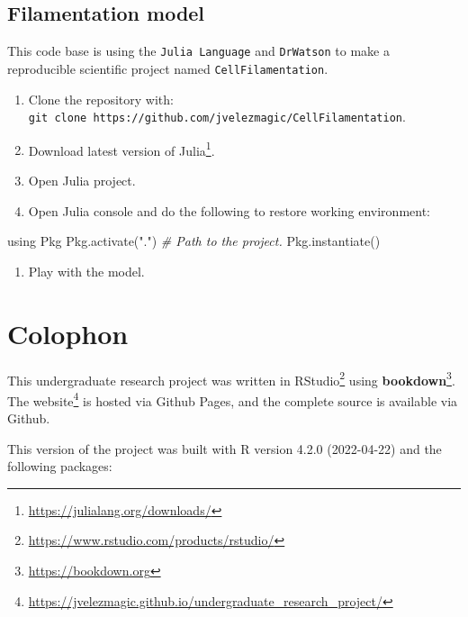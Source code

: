 \documentclass[
  12pt,
  a4paper,
  oneside]{krantz}
\newenvironment{Shaded}{\begin{snugshade}}{\end{snugshade}}
\newcommand{\CommentTok}[1]{\textcolor[rgb]{0.56,0.35,0.01}{\textit{#1}}}
\newcommand{\NormalTok}[1]{#1}
\newcommand{\StringTok}[1]{\textcolor[rgb]{0.31,0.60,0.02}{#1}}
\providecommand{\tightlist}{%
  \setlength{\itemsep}{0pt}\setlength{\parskip}{0pt}}
\renewcommand{\href}[2]{#2\footnote{\url{#1}}}
\begin{document}
\hypertarget{filamentation-model-1}{%
\section{Filamentation model}\label{filamentation-model-1}}

This code base is using the \texttt{Julia\ Language} and \texttt{DrWatson} to make a
reproducible scientific project named \texttt{CellFilamentation}.

\begin{enumerate}
\def\labelenumi{\arabic{enumi}.}
\tightlist
\item
  Clone the repository with:
  \texttt{git\ clone\ https://github.com/jvelezmagic/CellFilamentation}.
\item
  Download latest version of
  \href{https://julialang.org/downloads/}{Julia}.
\item
  Open Julia project.
\item
  Open Julia console and do the following to restore working
  environment:
\end{enumerate}

\begin{Shaded}
\begin{Highlighting}[]
\NormalTok{using Pkg}
\NormalTok{Pkg.activate(}\StringTok{"."}\NormalTok{) }\CommentTok{# Path to the project.}
\NormalTok{Pkg.instantiate()}
\end{Highlighting}
\end{Shaded}

\begin{enumerate}
\def\labelenumi{\arabic{enumi}.}
\setcounter{enumi}{4}
\tightlist
\item
  Play with the model.
\end{enumerate}

\hypertarget{colophon}{%
\chapter{Colophon}\label{colophon}}

This undergraduate research project was written in
\href{https://www.rstudio.com/products/rstudio/}{RStudio}
using \href{https://bookdown.org}{\textbf{bookdown}}.
The \href{https://jvelezmagic.github.io/undergraduate_research_project/}{website} is
hosted via Github Pages, and the complete source is
available via Github.

This version of the project was built with R version 4.2.0 (2022-04-22) and the
following packages:
\end{document}
